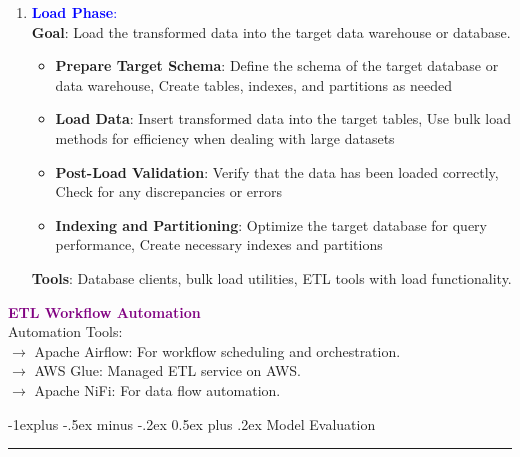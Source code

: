 \documentclass[letterpaper, 10.5pt,landscape]{article}
\makeatletter
\renewcommand{\subsection}{\@startsection{subsection}{2}{0mm}%
                                {-1explus -.5ex minus -.2ex}%
                                {0.5ex plus .2ex}%
                                {\normalfont\normalsize\bfseries}}
\makeatother
\begin{document}
\begin{multicols*}{3}
\begin{enumerate}[leftmargin=0.37cm]
    \item \textcolor{blue}{\textbf{Load Phase}:} \\
    \textbf{Goal}: Load the transformed data into the target data warehouse or database.
    \vspace{-2pt}
    \begin{itemize}[leftmargin=0.35cm]
        \vspace{-3pt}
        \item \textbf{Prepare Target Schema}: Define the schema of the target database or data warehouse, Create tables, indexes, and partitions as needed
        \vspace{-3pt}
        \item \textbf{Load Data}: Insert transformed data into the target tables, Use bulk load methods for efficiency when dealing with large datasets
        \vspace{-3pt}
        \item \textbf{Post-Load Validation}: Verify that the data has been loaded correctly, Check for any discrepancies or errors
        \vspace{-3pt}
        \item \textbf{Indexing and Partitioning}: Optimize the target database for query performance, Create necessary indexes and partitions
    \end{itemize}
    \vspace{-3pt}
    \textbf{Tools}:  Database clients, bulk load utilities, ETL tools with load functionality.
\end{enumerate}

\vspace{5pt}
\textcolor{purple}{\textbf{ETL Workflow Automation}} \\
Automation Tools:  \\
$\rightarrow$ Apache Airflow: For workflow scheduling and orchestration.\\
$\rightarrow$ AWS Glue: Managed ETL service on AWS.\\
$\rightarrow$ Apache NiFi: For data flow automation.


















\subsection{Model Evaluation} {\color{teal}\hrule height 0.5pt} \smallskip


\end{multicols*}
\end{document}
